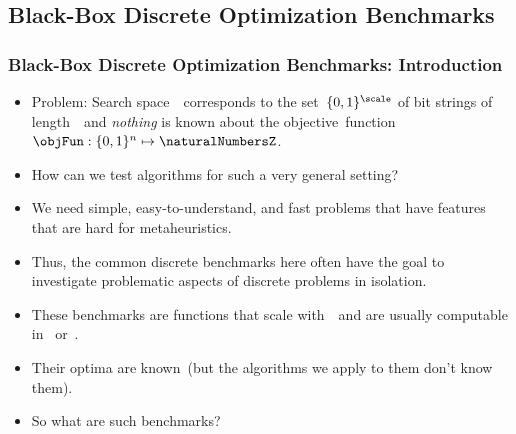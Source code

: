 \documentclass[aspectratio=169,mathserif,notheorems]{beamer}%
\begin{document}
\subsection{Black-Box Discrete Optimization Benchmarks}%
%
%
\begin{frame}%
\frametitle{Black-Box Discrete Optimization Benchmarks: Introduction}%
\begin{itemize}%
%
\item \alert{Problem}: Search space~\searchSpace\ corresponds to the set~$\{0,1\}^{\scale}$ of bit strings of length~\scale\ and \emph{nothing} is known about the objective~function~$\objFun:\{0,1\}^n\mapsto\naturalNumbersZ$.%
%
\item<2-> How can we test algorithms for such a very general setting?%
%
\item<3-> We need simple, easy-to-understand, and fast problems that have features that are hard for \glspl{metaheuristic}.%
%
\item<4-> Thus, the common discrete benchmarks here often have the goal to investigate problematic aspects of discrete problems in isolation\cite{ZWWW2026WFFAFTSIFGLS,DYHWSB2020BDOHWI}.%
%
\item<5-> These benchmarks are functions that scale with~\scale\ and are usually computable in~\bigOb{\scale} or~.%
%
\item<6-> Their optima are known~(but the algorithms we apply to them don't know them).%
%
\item<7-> So what are such benchmarks?%
%
\end{itemize}%
\end{frame}%
%
\end{document}
